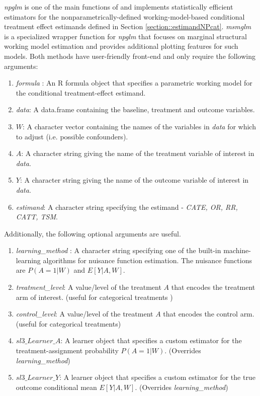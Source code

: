 \documentclass[
]{jss}
\begin{document}
\textit{npglm} is one of the main functions of  and
implements statistically efficient estimators for the
nonparametrically-defined working-model-based conditional treatment
effect estimands defined in Section \ref{section::estimandNPcat}.
\textit{msmglm} is a specialized wrapper function for \textit{npglm}
that focuses on marginal structural working model estimation and
provides additional plotting features for such models. Both methods have
user-friendly front-end and only require the following arguments:

\begin{enumerate}
\item \textit{formula} : An R formula object that specifies a parametric working model for the conditional treatment-effect estimand.
\item \textit{data}: A data.frame containing the baseline, treatment and outcome variables.
\item $W$: A character vector containing the names of the variables in \textit{data} for which to adjust (i.e. possible confounders).
\item $A$:  A character string giving the name of the treatment variable of interest in \textit{data}.
\item $Y$: A character string giving the name of the outcome variable of interest in \textit{data}.
\item \textit{estimand}: A character string specifying the estimand - \textit{CATE, OR, RR, CATT, TSM}.
\end{enumerate}

Additionally, the following optional arguments are useful.

\begin{enumerate}
\item \textit{learning\_method} : A character string specifying one of the built-in machine-learning algorithms for nuisance function estimation. The nuisance functions are $P(A=1|W)$ and $E[Y|A,W]$.
\item \textit{treatment\_level}: A value/level of the treatment $A$ that encodes the treatment arm of interest. (useful for categorical treatments )
\item \textit{control\_level}: A value/level of the treatment $A$ that encodes the control arm. (useful for categorical treatments)
\item $sl3\_Learner\_A$: A  learner object that specifies a custom estimator for the treatment-assignment probability $P(A=1|W)$. (Overrides \textit{learning\_method})
\item $sl3\_Learner\_Y$: A  learner object that specifies a custom estimator for the true outcome conditional mean $E[Y|A,W]$. (Overrides \textit{learning\_method})
\end{enumerate}
\end{document}
